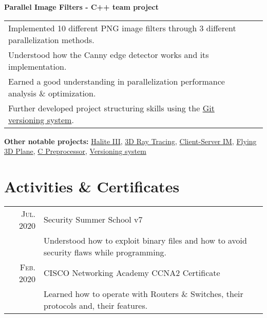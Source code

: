 \documentclass[a4paper,10pt]{article}
\begin{document}
	\begin{flushleft}
		\textbf{Parallel Image Filters - C++ team project}
	\end{flushleft}
	\begin{tabular}{ll}
		\textbullet\enspace\enspace Implemented 10 different PNG image filters through 3 different parallelization methods.\\
		\textbullet\enspace\enspace Understood how the Canny edge detector works and its implementation.\\
		\textbullet\enspace\enspace Earned a good understanding in parallelization performance analysis \& optimization.\\
		\textbullet\enspace\enspace Further developed project structuring skills using the \href{https://github.com/craciunoiuc/parallel-architectures}{Git versioning system}.\\
	\end{tabular}

	\begin{flushleft}
	\textbf{Other notable projects:} 
		\href{https://github.com/craciunoiuc/Halite-III}{Halite III},
		\href{https://github.com/craciunoiuc/computer-graphics-2}{3D Ray Tracing},
		\href{https://github.com/craciunoiuc/network-protocols/tree/master/Client%20-%20Server}{Client-Server IM},
		\href{https://github.com/craciunoiuc/computer-graphics/tree/master/Source/Teme/Flying%203D%20Plane}{Flying 3D Plane},
		\href{https://github.com/craciunoiuc/operating-systems/tree/master/1-multi}{C Preprocessor},
		\href{https://github.com/craciunoiuc/oop-homework/tree/master/Version%20Control%20System}{Versioning system}
	\end{flushleft}

\section{Activities \& Certificates}
	\begin{tabular}{rl}
		\textsc{Jul.} 2020 & Security Summer School v7\\&
			\textbullet\enspace\enspace Understood how to exploit binary files and how to avoid security flaws while programming.\\
		\textsc{Feb.} 2020 & CISCO Networking Academy CCNA2 Certificate\\&
			\textbullet\enspace\enspace Learned how to operate with Routers \& Switches, their protocols and, their features.\\
	\end{tabular}
\end{document}
